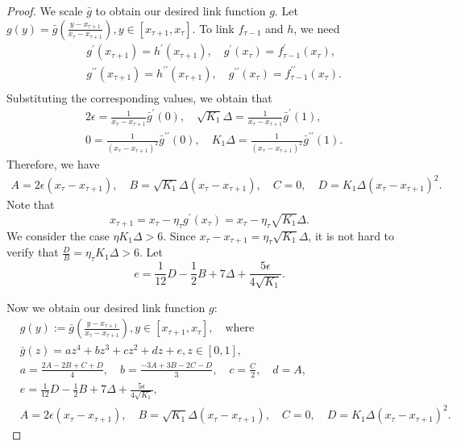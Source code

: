 \documentclass{article}
\newcommand{\paren}[1]{\left( #1 \right)}
\begin{document}
\begin{proof}
We scale $\bar{g}$ to obtain our desired link function $g$.
Let 
$g(y)=\bar{g}\left(\frac{y-x_{\tau+1}}{x_\tau-x_{\tau+1}}\right),y\in[x_{\tau+1},x_\tau]$.
To link $f_{\tau-1}$ and $h$, we need 
\begin{align*}
    & g^{\prime}(x_{\tau+1})=h^\prime(x_{\tau+1}),\quad 
    g^{\prime}(x_\tau)=f^{\prime}_{\tau-1}(x_\tau),\\
    & g^{\prime\prime}(x_{\tau+1})=h^{\prime\prime}(x_{\tau+1}),\quad 
    g^{\prime\prime}(x_\tau)=f^{\prime\prime}_{\tau-1}(x_\tau).\\
\end{align*}
Substituting the corresponding values, we obtain that
\begin{align*}
    &2\epsilon=\frac{1}{x_{\tau}-x_{\tau+1}}\bar{g}^\prime(0), \quad \sqrt{K_1}\Delta=\frac{1}{x_{\tau}-x_{\tau+1}}\bar{g}^\prime(1),\\
    &0=\frac{1}{(x_{\tau}-x_{\tau+1})^2}\bar{g}^{\prime\prime}(0), \quad K_1\Delta=\frac{1}{(x_{\tau}-x_{\tau+1})^2}\bar{g}^{\prime\prime}(1).
\end{align*}
Therefore, we have 
\begin{align*}
    A=2\epsilon\paren{x_{\tau}-x_{\tau+1}},\quad B=\sqrt{K_1}\Delta \paren{x_{\tau}-x_{\tau+1}},\quad C=0,\quad
    D=K_1\Delta \paren{x_{\tau}-x_{\tau+1}}^2.
\end{align*}
Note that
$$x_{\tau+1}=x_\tau-\eta_\tau g^\prime(x_\tau)=x_\tau-\eta_\tau\sqrt{K_1}\Delta.$$
We consider the case $\eta K_1\Delta>6$. 
Since $x_{\tau}-x_{\tau+1}=\eta_\tau \sqrt{K_1}\Delta$,
it is not hard to verify that $\frac{D}{B}=\eta_\tau K_1\Delta>6$. Let 
$$e=\frac{1}{12}D-\frac{1}{2}B+7\Delta+\frac{5\epsilon}{4\sqrt{K_1}}.$$ 

Now we obtain our desired link function $g$: 
\begin{equation}\label{eq:lower_polynomial}
    \begin{aligned}
        &g(y):=\bar{g}\paren{\frac{y-x_{\tau+1}}{x_\tau-x_{\tau+1}}}, y\in[x_{\tau+1},x_\tau], \quad\text{where}\\
        &\bar{g}(z)=az^4+bz^3+cz^2+dz+e,z\in[0,1],\\
        & a=\frac{2A-2B+C+D}{4},\quad b=\frac{-3A+3B-2C-D}{3}, \quad c=\frac{C}{2}, \quad d=A,\\
        & e= \frac{1}{12}D-\frac{1}{2}B+7\Delta+\frac{5\epsilon}{4\sqrt{K_1}},\\
        &A=2\epsilon\paren{x_\tau-x_{\tau+1}},\quad B=\sqrt{K_1}\Delta\paren{x_\tau-x_{\tau+1}},\quad C=0,\quad D=K_1\Delta\paren{x_\tau-x_{\tau+1}}^2.
    \end{aligned}
\end{equation}


\end{proof}
\end{document}
